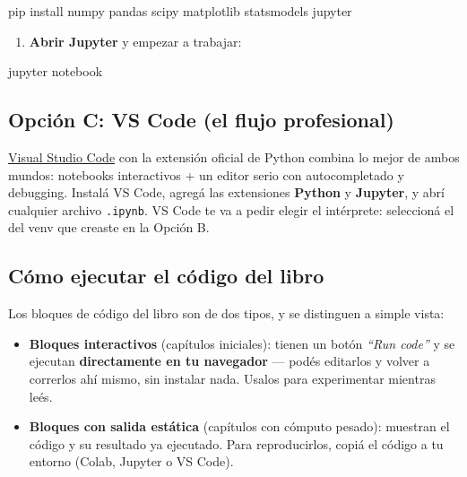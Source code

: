 \documentclass[
  spanish,
  letterpaper,
  DIV=11,
  numbers=noendperiod]{scrreprt}
\newenvironment{Shaded}{\begin{snugshade}}{\end{snugshade}}
\newcommand{\ExtensionTok}[1]{\textcolor[rgb]{0.00,0.23,0.31}{#1}}
\newcommand{\NormalTok}[1]{\textcolor[rgb]{0.00,0.23,0.31}{#1}}
\providecommand{\tightlist}{%
  \setlength{\itemsep}{0pt}\setlength{\parskip}{0pt}}
\begin{document}
\begin{Shaded}
\begin{Highlighting}[]
\ExtensionTok{pip}\NormalTok{ install numpy pandas scipy matplotlib statsmodels jupyter}
\end{Highlighting}
\end{Shaded}

\begin{enumerate}
\def\labelenumi{\arabic{enumi}.}
\setcounter{enumi}{3}
\tightlist
\item
  \textbf{Abrir Jupyter} y empezar a trabajar:
\end{enumerate}

\begin{Shaded}
\begin{Highlighting}[]
\ExtensionTok{jupyter}\NormalTok{ notebook}
\end{Highlighting}
\end{Shaded}

\subsection{Opción C: VS Code (el flujo
profesional)}\label{opciuxf3n-c-vs-code-el-flujo-profesional}

\href{https://code.visualstudio.com/}{Visual Studio Code} con la
extensión oficial de Python combina lo mejor de ambos mundos: notebooks
interactivos + un editor serio con autocompletado y debugging. Instalá
VS Code, agregá las extensiones \textbf{Python} y \textbf{Jupyter}, y
abrí cualquier archivo \texttt{.ipynb}. VS Code te va a pedir elegir el
intérprete: seleccioná el del venv que creaste en la Opción B.

\subsection{Cómo ejecutar el código del
libro}\label{cuxf3mo-ejecutar-el-cuxf3digo-del-libro}

Los bloques de código del libro son de dos tipos, y se distinguen a
simple vista:

\begin{itemize}
\tightlist
\item
  \textbf{Bloques interactivos} (capítulos iniciales): tienen un botón
  \emph{``Run code''} y se ejecutan \textbf{directamente en tu
  navegador} --- podés editarlos y volver a correrlos ahí mismo, sin
  instalar nada. Usalos para experimentar mientras leés.
\item
  \textbf{Bloques con salida estática} (capítulos con cómputo pesado):
  muestran el código y su resultado ya ejecutado. Para reproducirlos,
  copiá el código a tu entorno (Colab, Jupyter o VS Code).
\end{itemize}
\end{document}
